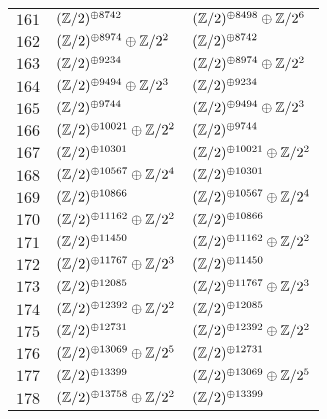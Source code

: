 \begin{supertabular}{|c|p{5.5cm}|p{5.5cm}|}
$161$%
&$(\mathbb{Z}/2)^{\oplus8742}$%
&$(\mathbb{Z}/2)^{\oplus8498}\oplus\mathbb{Z}/2^{6}$\\

$162$%
&$(\mathbb{Z}/2)^{\oplus8974}\oplus\mathbb{Z}/2^{2}$%
&$(\mathbb{Z}/2)^{\oplus8742}$\\

$163$%
&$(\mathbb{Z}/2)^{\oplus9234}$%
&$(\mathbb{Z}/2)^{\oplus8974}\oplus\mathbb{Z}/2^{2}$\\

$164$%
&$(\mathbb{Z}/2)^{\oplus9494}\oplus\mathbb{Z}/2^{3}$%
&$(\mathbb{Z}/2)^{\oplus9234}$\\

$165$%
&$(\mathbb{Z}/2)^{\oplus9744}$%
&$(\mathbb{Z}/2)^{\oplus9494}\oplus\mathbb{Z}/2^{3}$\\

$166$%
&$(\mathbb{Z}/2)^{\oplus10021}\oplus\mathbb{Z}/2^{2}$%
&$(\mathbb{Z}/2)^{\oplus9744}$\\

$167$%
&$(\mathbb{Z}/2)^{\oplus10301}$%
&$(\mathbb{Z}/2)^{\oplus10021}\oplus\mathbb{Z}/2^{2}$\\

$168$%
&$(\mathbb{Z}/2)^{\oplus10567}\oplus\mathbb{Z}/2^{4}$%
&$(\mathbb{Z}/2)^{\oplus10301}$\\

$169$%
&$(\mathbb{Z}/2)^{\oplus10866}$%
&$(\mathbb{Z}/2)^{\oplus10567}\oplus\mathbb{Z}/2^{4}$\\

$170$%
&$(\mathbb{Z}/2)^{\oplus11162}\oplus\mathbb{Z}/2^{2}$%
&$(\mathbb{Z}/2)^{\oplus10866}$\\

$171$%
&$(\mathbb{Z}/2)^{\oplus11450}$%
&$(\mathbb{Z}/2)^{\oplus11162}\oplus\mathbb{Z}/2^{2}$\\

$172$%
&$(\mathbb{Z}/2)^{\oplus11767}\oplus\mathbb{Z}/2^{3}$%
&$(\mathbb{Z}/2)^{\oplus11450}$\\

$173$%
&$(\mathbb{Z}/2)^{\oplus12085}$%
&$(\mathbb{Z}/2)^{\oplus11767}\oplus\mathbb{Z}/2^{3}$\\

$174$%
&$(\mathbb{Z}/2)^{\oplus12392}\oplus\mathbb{Z}/2^{2}$%
&$(\mathbb{Z}/2)^{\oplus12085}$\\

$175$%
&$(\mathbb{Z}/2)^{\oplus12731}$%
&$(\mathbb{Z}/2)^{\oplus12392}\oplus\mathbb{Z}/2^{2}$\\

$176$%
&$(\mathbb{Z}/2)^{\oplus13069}\oplus\mathbb{Z}/2^{5}$%
&$(\mathbb{Z}/2)^{\oplus12731}$\\

$177$%
&$(\mathbb{Z}/2)^{\oplus13399}$%
&$(\mathbb{Z}/2)^{\oplus13069}\oplus\mathbb{Z}/2^{5}$\\

$178$%
&$(\mathbb{Z}/2)^{\oplus13758}\oplus\mathbb{Z}/2^{2}$%
&$(\mathbb{Z}/2)^{\oplus13399}$\\


\end{supertabular}
